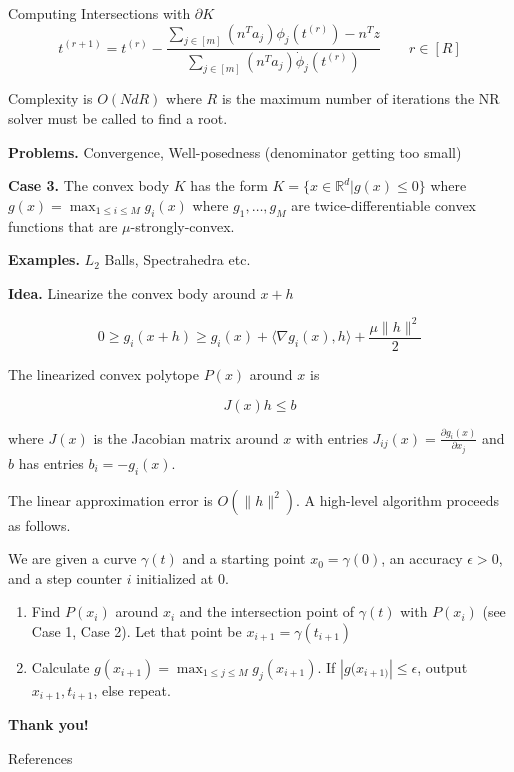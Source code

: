 \documentclass{beamer}
\begin{document}
\begin{frame}[allowframebreaks]{Computing Intersections with $\partial K$}
    \begin{equation*}
        t^{(r + 1)} = t^{(r)} - \frac {\sum_{j \in [m]} (n^T a_j) \phi_j(t^{(r)}) - n^T z } {\sum_{j \in [m]} (n^T a_j) \dot \phi_j(t^{(r)})} \qquad r \in [R]
    \end{equation*}

    Complexity is $O(NdR)$ where $R$ is the maximum number of iterations the NR solver must be called to find a root. 
    
    \textbf{Problems.} Convergence, Well-posedness (denominator getting too small)

    \framebreak
    
    \textbf{Case 3.} The convex body $K$ has the form $K = \{ x \in \mathbb R^d | g(x) \le 0 \}$ where $g(x) = \max_{1 \le i \le M} g_i(x)$ where $g_1, \dots, g_M$ are twice-differentiable convex functions that are $\mu$-strongly-convex. 
    
    \medskip
    
    \textbf{Examples.} $L_2$ Balls, Spectrahedra etc.
    
    \medskip
    
    \textbf{Idea.} Linearize the convex body around $x + h$
    
    $$0 \ge g_i(x + h) \ge g_i(x) + \langle \nabla g_i(x), h \rangle + \frac {\mu \| h \|^2}  2 $$
    
    The linearized convex polytope $P(x)$ around $x$ is 
    
    $$J(x) h \le b$$
    
    where $J(x)$ is the Jacobian matrix around $x$ with entries $J_{ij}(x) = \frac {\partial g_i(x)} {\partial x_j}$ and $b$ has entries $b_i = -g_i(x)$.
    
    \framebreak 
    
    The linear approximation error is $O(\| h \|^2)$.     A high-level algorithm proceeds as follows.
    
    \medskip

    We are given a curve $\gamma(t)$ and a starting point $x_0 = \gamma(0)$, an accuracy $\epsilon > 0$, and a step counter $i$ initialized at 0.
    
    \begin{enumerate}
        
        \item Find $P(x_i)$ around $x_i$ and the intersection point of $\gamma(t)$ with $P(x_i)$ (see Case 1, Case 2). Let that point be $x_{i + 1} = \gamma(t_{i + 1})$
        \item Calculate $g(x_{i + 1}) = \max_{1 \le j \le M} g_j(x_{i + 1})$. If $|g(x_{i + 1)}| \le \epsilon$, output $x_{i + 1}, t_{i + 1}$, else repeat. 
    \end{enumerate}
    
    
    
\end{frame}

\begin{frame}{}
    \vfill
    \centering
    \Huge {
        \textbf{Thank you!}
    }
    \vfill
\end{frame}



\begin{frame}[allowframebreaks]{References}
    \small {

    
    
    
    }
\end{frame}
\end{document}
